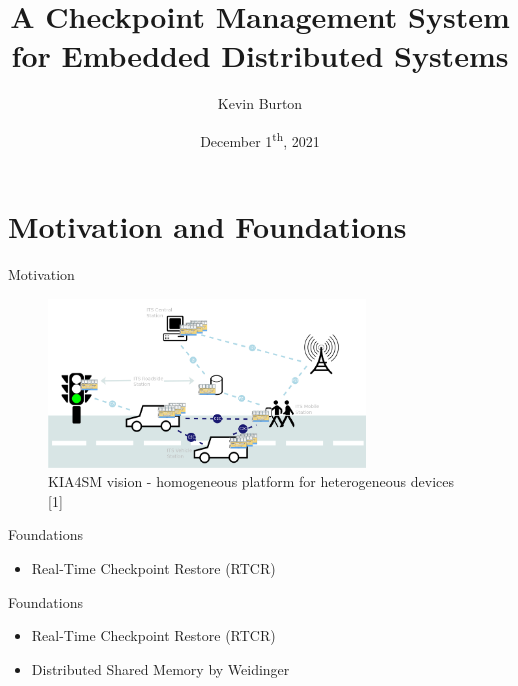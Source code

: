 \documentclass[
  english,            %
  aspectratio=169,    %
]{tumbeamer}
\title{A Checkpoint Management System for Embedded Distributed Systems}
\author{Kevin Burton}
\institute{\theChairName\\\theDepartmentName\\\theUniversityName}
\date[01/12/2021]{December 1\textsuperscript{th}, 2021}
\begin{document}
\maketitle

\section{Motivation and Foundations}
\begin{frame}{Motivation}{}
  \begin{figure}
      \centering
      \includegraphics[width=0.75\textwidth]{KIA4SM.PNG}
      \caption{KIA4SM vision - homogeneous platform for heterogeneous devices [1]}
      \label{fig:kia4sm}
  \end{figure}
\end{frame}

\begin{frame}{Foundations}
  \begin{itemize}
      \item Real-Time Checkpoint Restore (RTCR)
  \end{itemize}
\end{frame}

\begin{frame}{Foundations}
  \begin{itemize}
      \item Real-Time Checkpoint Restore (RTCR)
      \item Distributed Shared Memory by Weidinger
  \end{itemize}
\end{frame}
\end{document}
